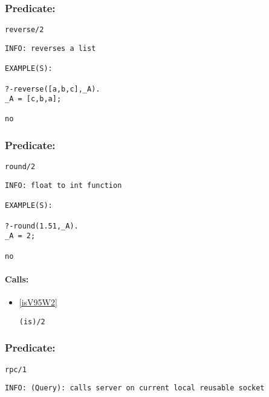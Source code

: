 \subsubsection{Predicate:} \label{reverseV95W2}

\begin{verbatim}
reverse/2
\end{verbatim}

{\small \begin{verbatim}
INFO: reverses a list

EXAMPLE(S):

?-reverse([a,b,c],_A).
_A = [c,b,a];

no

\end{verbatim}}

\subsubsection{Predicate:} \label{roundV95W2}

\begin{verbatim}
round/2
\end{verbatim}

{\small \begin{verbatim}
INFO: float to int function

EXAMPLE(S):

?-round(1.51,_A).
_A = 2;

no

\end{verbatim}}
\paragraph{Calls:} 
\begin{itemize}
\item \ref{isV95W2} 
\begin{verbatim}
(is)/2
\end{verbatim}

\end{itemize}

\subsubsection{Predicate:} \label{rpcV95W1}

\begin{verbatim}
rpc/1
\end{verbatim}

{\small \begin{verbatim}
INFO: (Query): calls server on current local reusable socket

\end{verbatim}}
